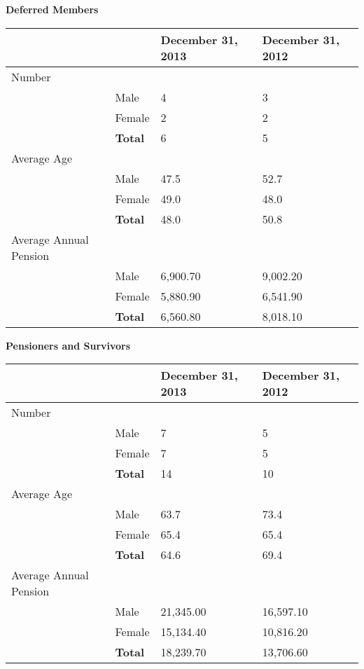 \documentclass{report}
\begin{document}
\vspace{8mm}
\textbf{Deferred Members} 

\vspace{3mm}
\bgroup
\normalsize
\def\arraystretch{1.5}
\begin{tabular}{p{4.0cm} p{2.5cm} p{4.0cm} p{4.0cm}}
\hline
& & \textbf{December 31, 2013 } & \textbf{December 31, 2012 } \\ \hline
Number \\
& Male & 4 & 3 \\ 
& Female & 2 & 2 \\ 
& \textbf{Total} & 6 & 5 \\ 
Average Age \\
& Male & 47.5 & 52.7 \\ 
& Female & 49.0 & 48.0 \\
& \textbf{Total} & 48.0 & 50.8 \\
Average Annual Pension \\
& Male & 6,900.70 & 9,002.20 \\
& Female & 5,880.90 & 6,541.90 \\
& \textbf{Total} & 6,560.80 & 8,018.10 \\ \hline
\end{tabular}
\egroup

\textbf{Pensioners and Survivors}

\vspace{3mm}
\bgroup
\normalsize
\def\arraystretch{1.5}
\begin{tabular}{p{4.0cm} p{2.5cm} p{4.0cm} p{4.0cm}}
\hline
& & \textbf{December 31, 2013 } & \textbf{December 31, 2012 } \\ \hline
Number \\
& Male & 7 & 5 \\ 
& Female & 7 & 5 \\ 
& \textbf{Total} & 14 & 10 \\ 
Average Age \\
& Male & 63.7 & 73.4 \\ 
& Female & 65.4 & 65.4 \\
& \textbf{Total} & 64.6 & 69.4 \\
Average Annual Pension \\
& Male & 21,345.00 & 16,597.10 \\
& Female & 15,134.40 & 10,816.20 \\
& \textbf{Total} & 18,239.70 & 13,706.60 \\ \hline
\end{tabular}
\egroup
\end{document}
